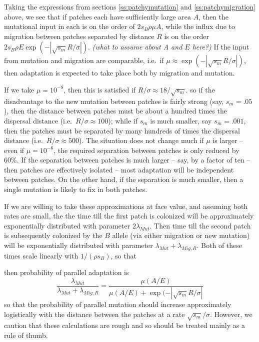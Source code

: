 \documentclass{article}
\newcommand{\gc}[1]{{ \it \color{green} (#1) } }
\begin{document}
Taking the expressions from sections \ref{ss:patchymutation} and \ref{ss:patchymigration} above,
we see that if patches each have sufficiently large area $A$,
then the mutational input in each is on the order of $2 s_B \rho \mu A$,
while the influx due to migration between patches separated by
distance $R$ is on the order $2 s_B \rho E \exp(- |\sqrt{s_m}
R/\sigma|)$. \gc{what to assume about A and $E$ here?}
If the input from mutation and migration are comparable, i.e.\ if $\mu \approx \exp( -|\sqrt{s_m} R/\sigma| )$,
then adaptation is expected to take place both by migration and
mutation.

If we take $\mu = 10^{-8}$, then this is satisfied if $R/\sigma \approx 18/\sqrt{s_m}$.
so if the disadvantage to the new mutation between patches is fairly strong (say, $s_m=.05$),
then the distance between patches must be about a hundred times the dispersal distance (i.e.\ $R/\sigma \approx 100$);
while if $s_m$ is much smaller, say $s_m = .001$, 
then the patches must be separated by many hundreds of times the dispersal distance (i.e.\ $R/\sigma \approx 500$).
The situation does not change much if $\mu$ is larger -- even if $\mu = 10^{-6}$, 
the required separation between patches is only reduced by 60\%.
If the separation between patches is much larger -- say, by a factor of ten -- 
then patches are effectively isolated -- most adaptation will be independent between patches.
On the other hand, if the separation is much smaller, then a single
mutation is likely to fix in both patches.

If we are willing to take these approximations at face
value, and assuming both rates are small, the the time till the first
patch is colonized will be approximately exponentially
distributed with parameter $2 \lambda_{Mut}$. Then time till the
second patch is subsequently colonized by the $B$
allele (via either migration or new mutation) will be exponentially
distributed with parameter $\lambda_{Mut}+\lambda_{Mig,R}$. Both of
these times scale linearly with $1/(\rho s_{B})$, so that 

then probability of parallel
adaptation is 
\begin{equation}
\frac{\lambda_{Mut}}{\lambda_{Mut} + \lambda_{Mig,R}} = \frac{\mu (A/E)}{\mu (A/E) + \exp(- |\sqrt{s_m} R/\sigma|}
\end{equation}
so that the probability of parallel mutation should increase
approximately logistically with the distance between the patches at a
rate $\sqrt{s_m} /\sigma$. However, we caution that these calculations
are rough and so should be treated mainly as a rule of thumb. 
\end{document}
